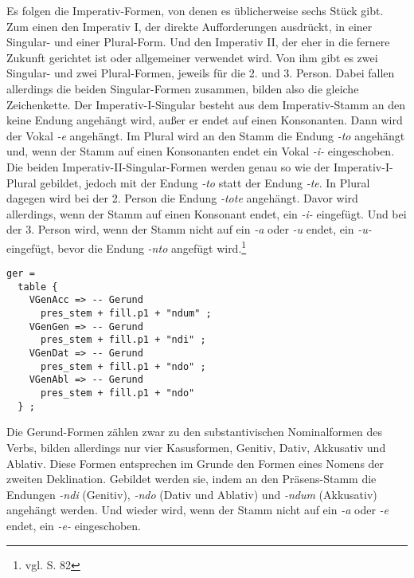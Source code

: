 Es folgen die Imperativ-Formen, von denen es üblicherweise sechs Stück gibt. Zum einen den Imperativ I, der direkte Aufforderungen ausdrückt, in einer Singular- und einer Plural-Form. Und den Imperativ II, der eher in die fernere Zukunft gerichtet ist oder allgemeiner verwendet wird. Von ihm gibt es zwei Singular- und zwei Plural-Formen, jeweils für die 2. und 3. Person. Dabei fallen allerdings die beiden Singular-Formen zusammen, bilden also die gleiche Zeichenkette. Der Imperativ-I-Singular besteht aus dem Imperativ-Stamm an den keine Endung angehängt wird, außer er endet auf einen Konsonanten. Dann wird der Vokal \textit{-e} angehängt. Im Plural wird an den Stamm die Endung \textit{-to} angehängt und, wenn der Stamm auf einen Konsonanten endet ein Vokal \textit{-i-} eingeschoben. Die beiden Imperativ-II-Singular-Formen werden genau so wie der Imperativ-I-Plural gebildet, jedoch mit der Endung \textit{-to} statt der Endung \textit{-te}. In Plural dagegen wird bei der 2. Person die Endung \textit{-tote} angehängt. Davor wird allerdings, wenn der Stamm auf einen Konsonant endet, ein \textit{-i-} eingefügt. Und bei der 3. Person wird, wenn der Stamm nicht auf ein \textit{-a} oder \textit{-u} endet, ein \textit{-u-} eingefügt, bevor die Endung \textit{-nto} angefügt wird.\footnote{vgl. \cite{BAYER-LINDAUER1994} S. 82} \par
\begin{lstlisting}[float=h!tp,caption={Ausschnitt aus der Funktion \texttt{mkVerb} um Gerundiv-Verbformen zu bilden (vgl. \textbf{ResLat.gf})},label={GF-Res-MkVerb-Ger},basicstyle=\small]
ger = 
  table {
    VGenAcc => -- Gerund
      pres_stem + fill.p1 + "ndum" ;
    VGenGen => -- Gerund
      pres_stem + fill.p1 + "ndi" ;
    VGenDat => -- Gerund
      pres_stem + fill.p1 + "ndo" ;
    VGenAbl => -- Gerund
      pres_stem + fill.p1 + "ndo" 
  } ;
\end{lstlisting}
Die Gerund-Formen zählen zwar zu den substantivischen Nominalformen des Verbs, bilden allerdings nur vier Kasusformen, Genitiv, Dativ, Akkusativ und Ablativ. Diese Formen entsprechen im Grunde den Formen eines Nomens der zweiten Deklination. Gebildet werden sie, indem an den Präsens-Stamm die Endungen \textit{-ndi} (Genitiv), \textit{-ndo} (Dativ und Ablativ) und \textit{-ndum} (Akkusativ) angehängt werden. Und wieder wird, wenn der Stamm nicht auf ein \textit{-a} oder \textit{-e} endet, ein \textit{-e-} eingeschoben.\par
